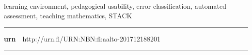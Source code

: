   \begin{spacing}{.88}
  {\parindent0pt %

  \parbox[t]{123.6mm}{\raggedright\small learning environment, pedagogical usability, error classification, automated assessment, teaching mathematics, STACK}

  \vspace{.5mm}\rule{\textwidth}{.75pt}

  {\fontsize{10.5pt}{10.5pt}\bfseries\sffamily\lsstyle urn}~~{\small http://urn.fi/URN:NBN:fi:aalto-201712188201}

  \vspace{-2.4mm}\rule{\textwidth}{.75pt}

  } %
  \end{spacing}




  \newpage



